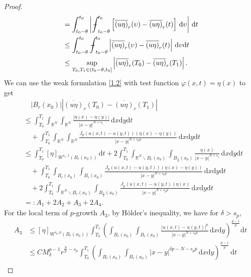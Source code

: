 \documentclass[reqno,10pt]{amsart}
\numberwithin{equation}{section}
\newcommand{ \mint }{ {\int\hspace{-0.38cm}-}}
\begin{document}
\begin{proof}
\begin{align}
		&=\int_{t_0-\theta}^{t_0}\left|\mint_{t_0-\theta}^{t_0}\left[ \overline{(u\eta)}_r(\upsilon)-\overline{(u\eta)}_r(t)\right]\,\mathrm{d}\upsilon\right|\,\mathrm{d}t\nonumber\\
		&\le\int_{t_0-\theta}^{t_0}\mint_{t_0-\theta}^{t_0}\left|\overline{(u\eta)}_r(\upsilon)-\overline{(u\eta)}_r(t)\right|\,\mathrm{d}\upsilon\mathrm{d}t\nonumber\\
		&\le\sup\limits_{T_0,T_1\in\left(t_0-\theta,t_0\right]}\left| \overline{(u\eta)}_r(T_0)-\overline{(u\eta)}_r(T_1)\right|.
	\end{align}
	We can use the weak formulation \eqref{1.2} with test function $\varphi(x,t)=\eta(x)$ to get
	\begin{align*}
		&\quad\left| B_r(x_0)\right| \left| \overline{(u\eta)}_r(T_0)-\overline{(u\eta)}_r(T_1)\right|\\
		&\le \int_{T_0}^{T_1}\int_{\mathbb{R}^N}\int_{\mathbb{R}^N}\frac{|\eta(x)-\eta(y)|}{|x-y|^{N+s_1}}\,\mathrm{d}x\mathrm{d}y\mathrm{d}t\\
		&\quad+\int_{T_0}^{T_1}\int_{\mathbb{R}^N}\int_{\mathbb{R}^N}\frac{J_p\left( u(x,t)-u(y,t)\right)\left( \eta(x)-\eta(y)\right)}{|x-y|^{N+s_pp}}\,\mathrm{d}x\mathrm{d}y\mathrm{d}t\\
		&\le\int_{T_0}^{T_1}[\eta]_{W^{s_1,1}(B_r(x_0))}\,\mathrm{d}t+2\int_{T_0}^{T_1}\int_{\mathbb{R}^N\backslash B_r(x_0)}\int_{B_{\frac{r}{2}}(x_0)}\frac{\eta(x)}{|x-y|^{N+s_1}}\,\mathrm{d}x\mathrm{d}y\mathrm{d}t\\
		&\quad+\int_{T_0}^{T_1}\int_{B_r(x_0)}\int_{B_r(x_0)}\frac{J_p\left( u(x,t)-u(y,t)\right)\left( \eta(x)-\eta(y)\right)}{|x-y|^{N+s_pp}}\,\mathrm{d}x\mathrm{d}y\mathrm{d}t\\
		&\quad+2\int_{T_0}^{T_1}\int_{\mathbb{R}^N\backslash B_r(x_0)}\int_{B_{\frac{r}{2}}(x_0)}\frac{J_p\left( u(x,t)-u(y,t)\right)\eta(x)}{|x-y|^{N+s_pp}}\,\mathrm{d}x\mathrm{d}y\mathrm{d}t\\
		&=:A_1+2A_2+A_3+2A_4.
	\end{align*}
	For the local term of $p$-growth $A_3$, by H\"{o}lder's inequality, we have for $\delta>s_p$,
	\begin{align*}
		A_3&\le[\eta]_{W^{s_p,p}(B_r(x_0))} \int_{T_0}^{T_1}\left(\int_{B_r(x_0)}\int_{B_r(x_0)}\frac{|u(x,t)-u(y,t)|^p}{|x-y|^{N+s_pp}}\,\mathrm{d}x\mathrm{d}y\right)^\frac{p-1}{p}\mathrm{d}t\\
		&\le CM_\delta^{p-1}r^{\frac{N}{p}-s_p}\int_{T_0}^{T_1}\left(\int_{B_r(x_0)}\int_{B_r(x_0)}|x-y|^{\delta p-N-s_pp}\,\mathrm{d}x\mathrm{d}y\right)^\frac{p-1}{p} \,\mathrm{d}t\\

\end{align*}
\end{proof}
\end{document}
